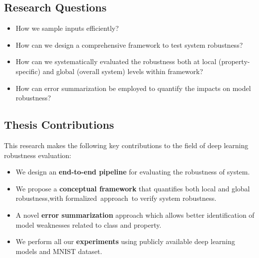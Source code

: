 \subsection{Research Questions}\hypertarget{researchquestions}{}
\begin{itemize}
	\item How we sample inputs efficiently?
	\item How can we design a comprehensive framework to test system robustness?
    \item How can we systematically evaluated the robustness both at local (property-specific) and global (overall system) levels within framework?
    \item How can error summarization be employed to quantify the impacts on model robustness?
 
   \end{itemize}




\subsection{Thesis Contributions}\hypertarget{contributions}{}

This research makes the following key contributions to the field of deep learning robustness evaluation:
\begin{itemize}
   
    \item We design an \textbf{end-to-end pipeline} for evaluating the robustness of system.
    
    \item We propose a \textbf{conceptual framework} that quantifies both local and global robustness,with formalized approach to verify system robustness.
    \item A novel \textbf{error summarization}  approach which allows better identification of model weaknesses related to class and property.

    \item We perform all our \textbf{experiments} using publicly available deep learning models and MNIST dataset.
\end{itemize}


